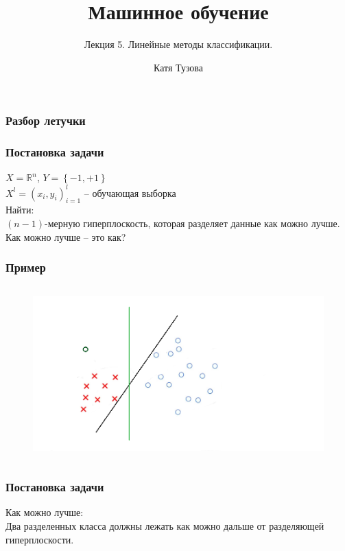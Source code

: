 \documentclass[12pt]{beamer}
\author{Катя Тузова}
\title{Машинное обучение}
\subtitle{Лекция 5. Линейные методы классификации.}
\date{}
\begin{document}
	
\frame{\titlepage}

\begin{frame}\frametitle{Разбор летучки}
\end{frame}


\begin{frame}\frametitle{Постановка задачи}
$X = \mathbb{R}^n$, ${Y = \left\{ -1, + 1\right\}}$\\
${X^l = (x_i, y_i)_{i = 1}^l}$ -- обучающая выборка\\
\vspace{5mm}Найти:\\
$(n-1)$-мерную гиперплоскость, которая разделяет данные как можно лучше.
\\ \vspace{5mm}
Как можно лучше -- это как?

\end{frame}

\begin{frame}\frametitle{Пример}
\begin{figure}[htbp]
  \includegraphics[height=190pt, keepaspectratio = true]{images/example}   
\end{figure}
\end{frame}

\begin{frame}\frametitle{Постановка задачи}
Как можно лучше:\\
Два разделенных класса должны лежать как можно дальше от разделяющей гиперплоскости.\\
\end{frame}


\end{document}
